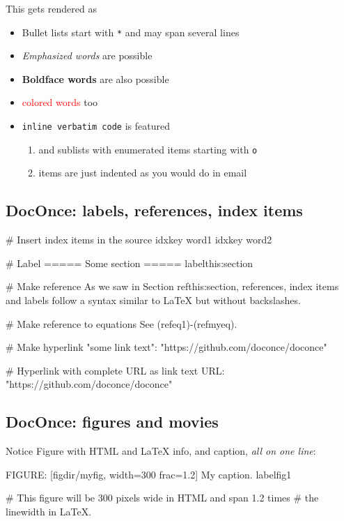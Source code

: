 \documentclass[%
oneside,                 %
final,                   %
10pt]{article}
\newcounter{doconce:movie:counter}
\begin{document}
This gets rendered as
\begin{itemize}
 \item Bullet lists start with \texttt{*} and may span several lines
 \item \emph{Emphasized words} are possible
 \item \textbf{Boldface words} are also possible
 \item \textcolor{red}{colored words} too
 \item \texttt{inline verbatim code} is featured
\begin{enumerate}
  \item and sublists with enumerated items starting with \texttt{o}
  \item items are just indented as you would do in email
\end{enumerate}
\noindent
\end{itemize}
\noindent
\subsection{DocOnce: labels, references, index items}
\bdo
# Insert index items in the source
idx{key word1} idx{key word2}

# Label
===== Some section =====
label{this:section}

# Make reference
As we saw in Section ref{this:section}, references, index
items and labels follow a syntax similar to LaTeX
but without backslashes.

# Make reference to equations
See (ref{eq1})-(ref{myeq}).

# Make hyperlink
"some link text": "https://github.com/doconce/doconce"

# Hyperlink with complete URL as link text
URL: "https://github.com/doconce/doconce"

\edo

\subsection{DocOnce: figures and movies}
\begin{block}{Notice}
Figure with HTML and {\LaTeX} info, and caption, \emph{all on one line}:
\end{block}
\bccq
FIGURE: [figdir/myfig, width=300 frac=1.2] My caption. label{fig1}

# This figure will be 300 pixels wide in HTML and span 1.2 times
# the linewidth in LaTeX.

\eccq
\end{document}
